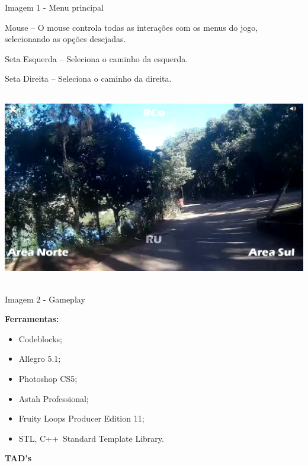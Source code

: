 \documentclass[a4paper]{article}
\newcommand\liststyleLSi{%
\renewcommand\labelitemi{\ding{108}}
\renewcommand\labelitemii{o}
\renewcommand\labelitemiii{{\FilledSmallSquare}}
\renewcommand\labelitemiv{\ding{108}}
}
\begin{document}
{\centering\color{black}
Imagem 1 - Menu principal
\par}


\bigskip


{\color{black}
Mouse – O mouse controla todas as interações com os menus do jogo,
selecionando as opções desejadas.}

{\color{black}
Seta Esquerda – Seleciona o caminho da esquerda.}

{\color{black}
Seta Direita – Seleciona o caminho da direita.}


\includegraphics[width=5.9165in,height=3.3335in]{UFSCar20Summer20Tour-img/UFSCar20Summer20Tour-img3.png}


{\centering\color{black}
Imagem 2 - Gameplay
\par}

{\color{black}
\textbf{Ferramentas:}}

\liststyleLSi
\begin{itemize}
\item {\color{black}
Codeblocks;}
\item {\color{black}
Allegro 5.1;}
\item {\color{black}
Photoshop CS5;}
\item {\color{black}
Astah Professional;}
\item {\color{black}
Fruity Loops Producer Edition 11;}
\item {\color{black}
STL, C++~Standard Template Library. }
\end{itemize}

\bigskip

{\color{black}
\textbf{TAD’s}}


\bigskip
\end{document}
